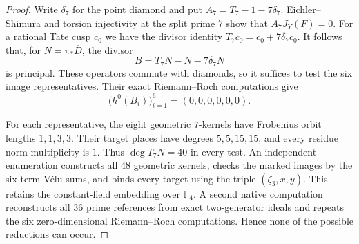 \begin{proof}
Write $\delta_7$ for the point diamond and put
$A_7=T_7-1-7\delta_7$. Eichler--Shimura and torsion injectivity
at the split prime $7$ show that $A_7J_Y(F)=0$.
For a rational Tate cusp $c_0$ we have the divisor identity
$T_7c_0=c_0+7\delta_7c_0$.
It follows that, for $N=\pi_*\overline D$, the divisor
\[
                         B=T_7N-N-7\delta_7N
\]
is principal. These operators commute with diamonds, so it suffices
to test the six image representatives.
Their exact Riemann--Roch computations give
\[
                  \bigl(h^0(B_i)\bigr)_{i=1}^6=(0,0,0,0,0,0).
\]

For each representative, the eight geometric $7$-kernels have
Frobenius orbit lengths $1,1,3,3$. Their target places have degrees
$5,5,15,15$, and every residue norm multiplicity is $1$.
Thus $\deg T_7N=40$ in every test.
An independent enumeration constructs all $48$ geometric kernels,
checks the marked images by the six-term V\'elu sums, and binds every
target using the triple $(\zeta_3,x,y)$. This retains the constant-field
embedding over $\mathbb F_4$.
A second native computation reconstructs all $36$ prime references
from exact two-generator ideals and repeats the six zero-dimensional
Riemann--Roch computations. Hence none of the possible reductions
can occur.
\end{proof}
